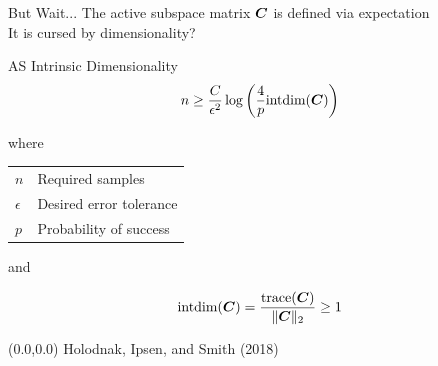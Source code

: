 \documentclass[14pt]{beamer}
\begin{document}
\begin{frame}{But Wait...}
  The active subspace matrix $\boldsymbol{C}$ is defined via expectation \\
  It is cursed by dimensionality?
\end{frame}

\begin{frame}{AS Intrinsic Dimensionality}
  \begin{equation*}
    n \geq \frac{C}{\epsilon^2}\log\left(\frac{4}{p}\text{intdim}(\boldsymbol{C})\right)
  \end{equation*}

  where

  \begin{table}
    \centering
    \begin{tabular}{@{}ll@{}}
      $n$ & Required samples \\
      $\epsilon$ & Desired error tolerance \\
      $p$ & Probability of success
    \end{tabular}
  \end{table}

  and

  \begin{equation*}
    \text{intdim}(\boldsymbol{C}) = \frac{\text{trace}(\boldsymbol{C})}{\|\boldsymbol{C}\|_2} \geq 1
  \end{equation*}

  \begin{textblock}{5}(0.0,0.0)
    {\tiny Holodnak, Ipsen, and Smith (2018)}
  \end{textblock}
\end{frame}
\end{document}
